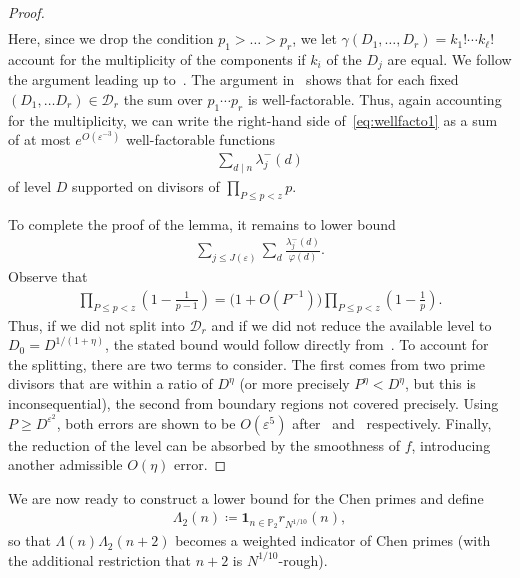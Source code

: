 \documentclass[12pt]{amsart}
\theoremstyle{definition}
\theoremstyle{remark}
\numberwithin{equation}{section}
\newcommand{\1}{\mathbf{1}}
\begin{document}
\begin{proof}
\begin{align}
    \end{align}
    Here, since we drop the condition $p_1>\ldots> p_r$, we let $ \gamma(D_1,\ldots ,D_r)=k_1!\cdots k_\ell!$ account for the multiplicity of the components if $k_i$ of the $D_j$ are equal. We follow the argument leading up to~\cite[eq. (12.91)]{cribro}. The argument in~\cite[Lemma 12.16]{cribro} shows that for each fixed $(D_1,\ldots D_r)\in \mathcal{D}_r$ the sum over $p_1\cdots p_r$ is well-factorable. Thus, again accounting for the multiplicity, we can write the right-hand side of~\eqref{eq:wellfacto1} as a sum of at most $e^{O(\varepsilon^{-3})}$ well-factorable functions
    \begin{align*}
        \sum_{d\mid n} \lambda^{-}_j(d)
    \end{align*}
    of level $D$ supported on divisors of $\prod_{P\leq p<z}p$. 
    
    To complete the proof of the lemma, it remains to lower bound
    \begin{align*}
       \sum_{j\leq J(\varepsilon)} \sum_{d} \frac{\lambda^{-}_j(d)}{\varphi(d)}.
    \end{align*}
    Observe that \begin{align*}
        \prod_{P\leq p < z}\left(1-\frac{1}{p-1}\right)= \bigl(1+O(P^{-1})\bigr)\prod_{P\leq p < z}\left(1-\frac{1}{p}\right).
    \end{align*}
    Thus, if we did not split into $\mathcal{D}_r$ and if we did not reduce the available level to $D_0=D^{1/(1+\eta)}$, the stated bound would follow directly from~\cite[eq. (12.5)]{cribro}.
    To account for the splitting, there are two terms to consider. The first comes from two prime divisors that are within a ratio of $D^\eta$ (or more precisely $P^{\eta}<D^\eta$, but this is inconsequential), the second from boundary regions not covered precisely. Using $P\geq D^{\varepsilon^2}$, both errors are shown to be $O(\varepsilon^5)$ after~\cite[eq. (12.88)]{cribro} and~\cite[eq. (12.89)]{cribro} respectively. Finally, the reduction of the level can be absorbed by the smoothness of $f$, introducing another admissible $O(\eta)$ error.
\end{proof}

We are now ready to construct a lower bound for the Chen primes and define
\begin{align}\label{eq:L2def}
    \Lambda_2(n)\coloneqq \1_{n\in\mathbb{P}_2}r_{N^{1/10}}(n),
\end{align}
so that $\Lambda(n)\Lambda_2(n+2)$ becomes a weighted indicator of Chen primes (with the additional restriction that $n+2$ is $N^{1/10}$-rough).
\end{document}
